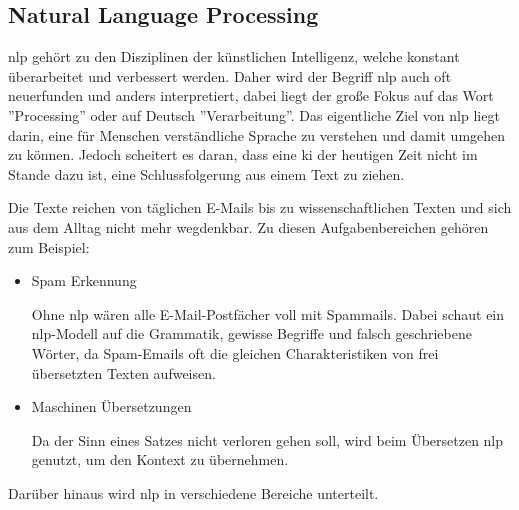 \subsection{Natural Language Processing}

\gls{nlp} gehört zu den Disziplinen der künstlichen Intelligenz, welche konstant überarbeitet und verbessert werden. Daher wird der Begriff \gls{nlp} auch oft neuerfunden und anders interpretiert, dabei liegt der große Fokus auf das Wort ''Processing'' oder auf Deutsch ''Verarbeitung''. Das eigentliche Ziel von \gls{nlp} liegt darin, eine für Menschen verständliche Sprache zu verstehen und damit umgehen zu können. Jedoch scheitert es daran, dass eine \gls{ki} der heutigen Zeit nicht im Stande dazu ist, eine Schlussfolgerung aus einem Text zu ziehen. \cite{NLP}

Die Texte reichen von täglichen E-Mails bis zu wissenschaftlichen Texten und sich aus dem Alltag nicht mehr wegdenkbar. Zu diesen Aufgabenbereichen gehören zum Beispiel: \cite{NLP-UC}

\begin{itemize}
    \item Spam Erkennung
    
    Ohne \gls{nlp} wären alle E-Mail-Postfächer voll mit Spammails. Dabei schaut ein \gls{nlp}-Modell auf die Grammatik, gewisse Begriffe und falsch geschriebene Wörter, da Spam-Emails oft die gleichen Charakteristiken von frei übersetzten Texten aufweisen. 

    \item Maschinen Übersetzungen
    
    Da der Sinn eines Satzes nicht verloren gehen soll, wird beim Übersetzen \gls{nlp} genutzt, um den Kontext zu übernehmen. 
\end{itemize}

Darüber hinaus wird \gls{nlp} in verschiedene Bereiche unterteilt.